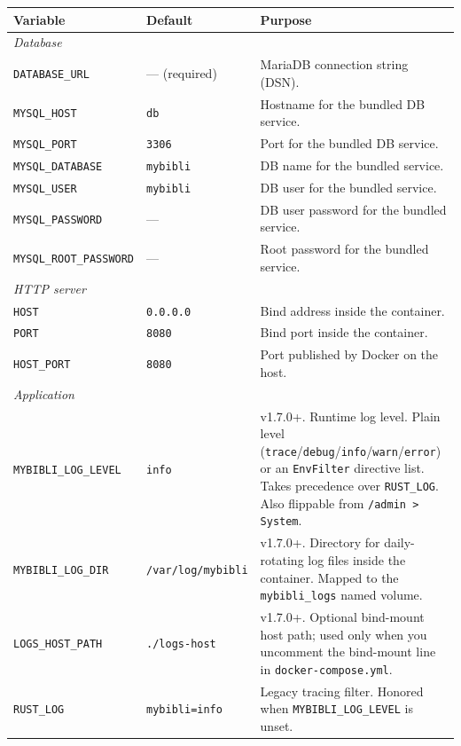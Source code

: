 {\small
\begin{longtable}{l l >{\raggedright\arraybackslash}p{6.2cm}}
\toprule
\textbf{Variable} & \textbf{Default} & \textbf{Purpose} \\
\midrule
\endhead
\multicolumn{3}{l}{\emph{Database}} \\
\texttt{DATABASE\_URL}        & --- (required) & MariaDB connection string (DSN). \\
\texttt{MYSQL\_HOST}          & \texttt{db}    & Hostname for the bundled DB service. \\
\texttt{MYSQL\_PORT}          & \texttt{3306}  & Port for the bundled DB service. \\
\texttt{MYSQL\_DATABASE}      & \texttt{mybibli} & DB name for the bundled service. \\
\texttt{MYSQL\_USER}          & \texttt{mybibli} & DB user for the bundled service. \\
\texttt{MYSQL\_PASSWORD}      & --- & DB user password for the bundled service. \\
\texttt{MYSQL\_ROOT\_PASSWORD}& --- & Root password for the bundled service. \\
\midrule
\multicolumn{3}{l}{\emph{HTTP server}} \\
\texttt{HOST}                 & \texttt{0.0.0.0} & Bind address inside the container. \\
\texttt{PORT}                 & \texttt{8080}    & Bind port inside the container. \\
\texttt{HOST\_PORT}           & \texttt{8080}    & Port published by Docker on the host. \\
\midrule
\multicolumn{3}{l}{\emph{Application}} \\
\texttt{MYBIBLI\_LOG\_LEVEL}  & \texttt{info}   & v1.7.0+. Runtime log level. Plain level (\texttt{trace}/\texttt{debug}/\texttt{info}/\texttt{warn}/\texttt{error}) or an \texttt{EnvFilter} directive list. Takes precedence over \texttt{RUST\_LOG}. Also flippable from \texttt{/admin > System}. \\
\texttt{MYBIBLI\_LOG\_DIR}    & \texttt{/var/log/mybibli} & v1.7.0+. Directory for daily-rotating log files inside the container. Mapped to the \texttt{mybibli\_logs} named volume. \\
\texttt{LOGS\_HOST\_PATH}     & \texttt{./logs-host} & v1.7.0+. Optional bind-mount host path; used only when you uncomment the bind-mount line in \texttt{docker-compose.yml}. \\
\texttt{RUST\_LOG}            & \texttt{mybibli=info} & Legacy tracing filter. Honored when \texttt{MYBIBLI\_LOG\_LEVEL} is unset. \\

\end{longtable}}
